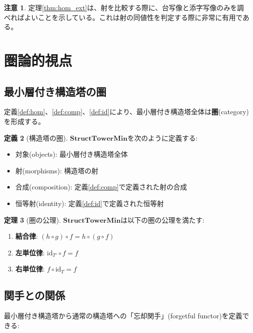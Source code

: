 \documentclass[a4paper,12pt]{article}
\theoremstyle{definition}
\newtheorem{definition}{定義}[section]
\newtheorem{theorem}[definition]{定理}
\newtheorem{remark}[definition]{注意}
\begin{document}
\begin{remark}
定理\ref{thm:hom_ext}は、射を比較する際に、台写像と添字写像のみを調べればよいことを示している。これは射の同値性を判定する際に非常に有用である。
\end{remark}

\section{圏論的視点}

\subsection{最小層付き構造塔の圏}

定義\ref{def:hom}、\ref{def:comp}、\ref{def:id}により、最小層付き構造塔全体は\textbf{圏}(category)を形成する。

\begin{definition}[構造塔の圏]
$\mathbf{StructTowerMin}$を次のように定義する:
\begin{itemize}
\item 対象(objects): 最小層付き構造塔全体
\item 射(morphisms): 構造塔の射
\item 合成(composition): 定義\ref{def:comp}で定義された射の合成
\item 恒等射(identity): 定義\ref{def:id}で定義された恒等射
\end{itemize}
\end{definition}

\begin{theorem}[圏の公理]
$\mathbf{StructTowerMin}$は以下の圏の公理を満たす:
\begin{enumerate}
\item \textbf{結合律}: $(h \circ g) \circ f = h \circ (g \circ f)$
\item \textbf{左単位律}: $\text{id}_{T'} \circ f = f$
\item \textbf{右単位律}: $f \circ \text{id}_T = f$
\end{enumerate}
\end{theorem}

\subsection{関手との関係}

最小層付き構造塔から通常の構造塔への「忘却関手」(forgetful functor)を定義できる:

\begin{center}
\end{center}
\end{document}

